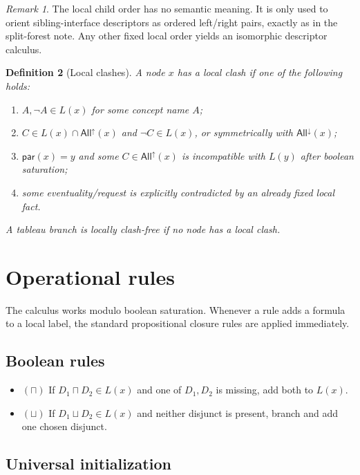\documentclass[11pt]{article}
\newtheorem{definition}{Definition}[section]
\theoremstyle{remark}
\newtheorem{remark}[definition]{Remark}
\newcommand{\AllUp}{\mathsf{All}^{\uparrow}}
\newcommand{\AllDown}{\mathsf{All}^{\downarrow}}
\begin{document}
\begin{remark}
The local child order has no semantic meaning. It is only used to orient sibling-interface descriptors as ordered left/right pairs, exactly as in the split-forest note. Any other fixed local order yields an isomorphic descriptor calculus.
\end{remark}

\begin{definition}[Local clashes]\label{def:local-clash}
A node $x$ has a \emph{local clash} if one of the following holds:
\begin{enumerate}[label=(\alph*)]
    \item $A,\neg A\in L(x)$ for some concept name $A$;
    \item $C\in L(x)\cap \AllUp(x)$ and $\neg C\in L(x)$, or symmetrically with $\AllDown(x)$;
    \item $\mathsf{par}(x)=y$ and some $C\in \AllUp(x)$ is incompatible with $L(y)$ after boolean saturation;
    \item some eventuality/request is explicitly contradicted by an already fixed local fact.
\end{enumerate}
A tableau branch is \emph{locally clash-free} if no node has a local clash.
\end{definition}

\section{Operational rules}

The calculus works modulo boolean saturation. Whenever a rule adds a formula to a local label, the standard propositional closure rules are applied immediately.

\subsection{Boolean rules}

\begin{itemize}
    \item $(\sqcap)$ If $D_1\sqcap D_2\in L(x)$ and one of $D_1,D_2$ is missing, add both to $L(x)$.
    \item $(\sqcup)$ If $D_1\sqcup D_2\in L(x)$ and neither disjunct is present, branch and add one chosen disjunct.
\end{itemize}

\subsection{Universal initialization}
\end{document}
